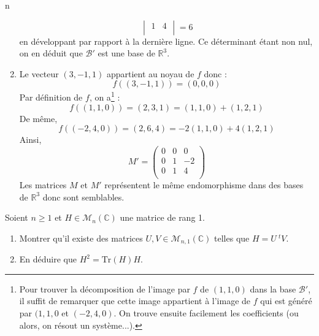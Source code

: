 n\documentclass[a4paper,10pt]{report}
\begin{document}
\begin{enumerate}
$$\begin{vmatrix}
 1 & 4\\
\end{vmatrix} = 6 $$
en développant par rapport à la dernière ligne. Ce déterminant étant non nul, on en déduit que $\mathcal{B}'$ est une base de $\mathbb{R}^3$.
\item Le vecteur $(3,-1,1)$ appartient au noyau de $f$ donc :
$$ f((3,-1,1))=(0,0,0)$$
Par définition de $f$, on a\footnote{Pour trouver la décomposition de l'image par $f$ de $(1,1,0)$ dans la base $\mathcal{B}'$, il suffit de remarquer que cette image appartient à l'image de $f$ qui est généré par $(1,1,0$ et $(-2,4,0)$. On trouve ensuite facilement les coefficients (ou alors, on résout un système...).} :
$$ f((1,1,0))=(2,3,1) = (1,1,0) + (1,2,1)$$
De même,
$$ f((-2,4,0))=(2,6,4) = -2(1,1,0) + 4(1,2,1) $$
Ainsi,
$$ M' = \begin{pmatrix}
0 & 0 & 0 \\
0 & 1 & -2 \\
0 & 1 & 4 \\
\end{pmatrix}$$
Les matrices $M$ et $M'$ représentent le même endomorphisme dans des bases de $\mathbb{R}^3$ donc sont semblables.
\end{enumerate}

\begin{Exercice}{} Soient $n \geq 1$ et $H \in \mathcal{M}_n(\mathbb{C})$ une matrice de rang 1.
    \begin{enumerate}
      \item
        Montrer qu'il existe des matrices $U,V \in \mathcal{M}_{n,1}(\mathbb{C})$ telles que $H = U ~^tV$.
      \item En déduire que $H^2 = \textrm{Tr}(H)H$.
 \end{enumerate}
\end{Exercice}

\corr 
\end{document}
